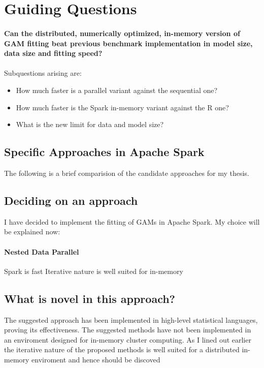 \documentclass{article}
\begin{document}
    \section{Guiding Questions}

    \paragraph{Can the distributed, numerically optimized, in-memory version of GAM fitting beat previous benchmark implementation in model size, data size and fitting speed?}

    \paragraph{}
    Subquestions arising are:
        \begin{itemize}
        \item How much faster is a parallel variant against the sequential one?
        \item How much faster is the Spark in-memory variant against the R one?
        \item What is the new limit for data and model size?
        \end{itemize}

    \subsection{Specific Approaches in Apache Spark}
    The following is a brief comparision of the candidate approaches for my thesis.




    \subsection{Deciding on an approach}

    I have decided to implement the fitting of GAMs in Apache Spark. My choice will be explained now:
    \paragraph{Nested Data Parallel}
        Spark is fast
        Iterative nature is well suited for in-memory



    \subsection{What is novel in this approach?}
    The suggested approach has been implemented in high-level statistical languages, proving its effectiveness. The suggested methods have not been implemented in an enviroment designed for in-memory cluster computing. As I lined out earlier the iterative nature of the proposed methods is well suited for a distributed in-memory enviroment and hence should be discoved
\end{document}
